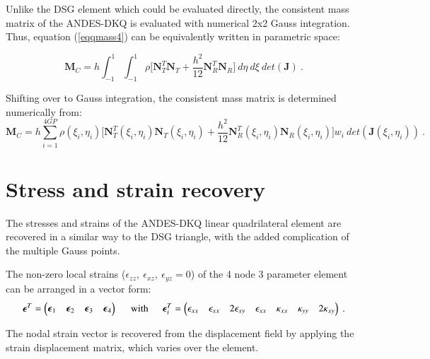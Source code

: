 Unlike the DSG element which could be evaluated directly, the consistent mass matrix of the ANDES-DKQ is evaluated with numerical 2x2 Gauss integration. Thus, equation (\ref{eqqmass4}) can be equivalently written in parametric space:

\begin{equation} 
\mathbf{M}_C
=
h
\int_{-1}^{1} 
\int_{-1}^{1} 
\rho 
\Big[
\mathbf{N}_T^T
\mathbf{N}_T
+
\frac{h^2}{12}
\mathbf{N}_R^T
\mathbf{N}_R
\Big]
\ d\eta
\ d\xi
\ det (\mathbf{J})
\label{eqqmass6}\ .
\end{equation}

Shifting over to Gauss integration, the consistent mass matrix is determined numerically from:
\begin{equation} 
\mathbf{M}_C
=
h
\sum_{i=1}^{4 GP}
\rho(\xi_{i},\eta_{i})
\Big[
\mathbf{N}_T^T(\xi_{i},\eta_{i})
\mathbf{N}_T(\xi_{i},\eta_{i})
+
\frac{h^2}{12}
\mathbf{N}_R^T(\xi_{i},\eta_{i})
\mathbf{N}_R(\xi_{i},\eta_{i})
\Big]
w_i
\ det (\mathbf{J}(\xi_{i},\eta_{i}))
\label{eqqmass7}\ .
\end{equation}

\section{Stress and strain recovery}

The stresses and strains of the ANDES-DKQ linear quadrilateral element are recovered in a similar way to the DSG triangle, with the added complication of the multiple Gauss points.

The non-zero local strains ($\epsilon_{zz},\ \epsilon_{xz},\ \epsilon_{yz} = 0$) of the 4 node 3 parameter element can be arranged in a vector form:
\begin{equation} 
\boldsymbol{\epsilon}^T = \begin{pmatrix}
\boldsymbol{\epsilon}_1 & \boldsymbol{\epsilon}_2 & \boldsymbol{\epsilon}_3 & \boldsymbol{\epsilon}_4
\end{pmatrix}
\hspace{5mm}
\text{with}
\hspace{5mm}
\boldsymbol{\epsilon}^T_i = \begin{pmatrix}
\epsilon_{xx} & \epsilon_{xx} & 2\epsilon_{xy} & \epsilon_{xx} & \kappa_{xx} & \kappa_{yy} & 2\kappa_{xy} 
\end{pmatrix}
\label{eqqrec1}\ .
\end{equation}

The nodal strain vector is recovered from the displacement field by applying the strain displacement matrix, which varies over the element.

